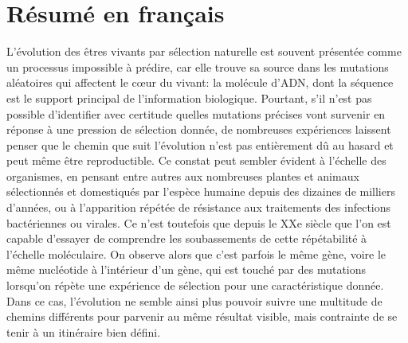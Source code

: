 
\chapter{Résumé en français}

L'évolution des êtres vivants par sélection naturelle est souvent présentée comme un processus impossible à prédire, car elle trouve sa source dans les mutations aléatoires qui affectent le cœur du vivant: la molécule d'ADN, dont la séquence est le support principal de l'information biologique.
Pourtant, s'il n'est pas possible d'identifier avec certitude quelles mutations précises vont survenir en réponse à une pression de sélection donnée, de nombreuses expériences laissent penser que le chemin que suit l'évolution n'est pas entièrement dû au hasard et peut même être reproductible.
Ce constat peut sembler évident à l'échelle des organismes, en pensant entre autres aux nombreuses plantes et animaux sélectionnés et domestiqués par l'espèce humaine depuis des dizaines de milliers d'années, ou à l'apparition répétée de résistance aux traitements des infections bactériennes ou virales.
Ce n'est toutefois que depuis le XXe siècle que l'on est capable d'essayer de comprendre les soubassements de cette répétabilité à l'échelle moléculaire.
On observe alors que c'est parfois le même gène, voire le même nucléotide à l'intérieur d'un gène, qui est touché par des mutations lorsqu'on répète une expérience de sélection pour une caractéristique donnée.
Dans ce cas, l'évolution ne semble ainsi plus pouvoir suivre une multitude de chemins différents pour parvenir au même résultat visible, mais contrainte de se tenir à un itinéraire bien défini.

